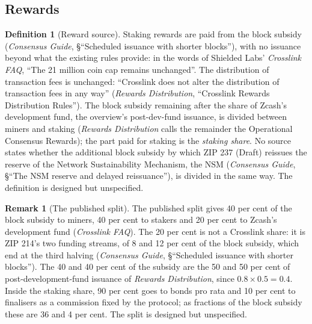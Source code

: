 \documentclass[11pt,a4paper]{article}
\theoremstyle{definition}
\newtheorem{definition}[theorem]{Definition}
\newtheorem{remark}[theorem]{Remark}
\begin{document}
\subsection{Rewards}\label{sec:fs-rewards}

\begin{definition}[Reward source]\label{def:reward-source}
Staking rewards are paid from the block subsidy (\emph{Consensus Guide},
\S``Scheduled issuance with shorter blocks''), with no issuance beyond what
the existing rules provide: in the words of Shielded Labs' \emph{Crosslink
FAQ}, ``The 21 million coin cap remains unchanged''. The distribution of
transaction fees is unchanged: ``Crosslink does not alter the distribution of
transaction fees in any way'' (\emph{Rewards Distribution}, ``Crosslink
Rewards Distribution Rules''). The block subsidy remaining after the share of
Zcash's development fund, the overview's post-dev-fund issuance, is divided
between miners and staking (\emph{Rewards Distribution} calls the remainder
the Operational Consensus Rewards); the part paid for staking is the
\emph{staking share}. No source states whether the additional block subsidy
by which ZIP 237 (Draft) reissues the reserve of the Network Sustainability
Mechanism, the NSM (\emph{Consensus Guide}, \S``The NSM reserve and delayed
reissuance''), is divided in the same way. The definition is designed but
unspecified.
\end{definition}

\begin{remark}[The published split]\label{rem:split}
The published split gives 40 per cent of the block subsidy to miners, 40 per
cent to stakers and 20 per cent to Zcash's development fund
(\emph{Crosslink FAQ}). The 20 per cent is not a Crosslink share: it is
ZIP 214's two funding streams, of 8 and 12 per cent of the block subsidy,
which end at the third halving (\emph{Consensus Guide}, \S``Scheduled
issuance with shorter blocks''). The 40 and 40 per cent of the subsidy are
the 50 and 50 per cent of post-development-fund issuance of \emph{Rewards
Distribution}, since $0.8 \times 0.5 = 0.4$. Inside the staking share,
90 per cent goes to bonds pro rata and 10 per cent to finalisers as a
commission fixed by the protocol; as fractions of the block subsidy these
are 36 and 4 per cent. The split is designed but unspecified.
\end{remark}
\end{document}
